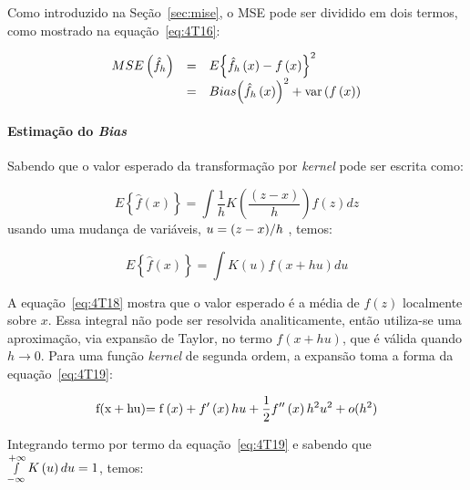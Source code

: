 Como introduzido na Seção~\ref{sec:mise}, o MSE pode ser dividido em dois termos, como mostrado na equação~\ref{eq:4T16}:

\begin{equation}\label{eq:4T16}
\begin{array}{ccl}
 MSE\left( {{{\hat f}_h}} \right) &=& E{\left\{ {{{\hat f}_h}\left( x \right) - f\left( x \right)} \right\}^2} \\
  &=& Bias{\left( {{{\hat f}_h}\left( x \right)} \right)^2} + {\mathop{\rm var}} \left( {f\left( x \right)} \right) \\
 \end{array}
\end{equation}

\paragraph{Estimação do \emph{Bias}}

Sabendo que o valor esperado da transformação por \emph{kernel} pode ser escrita como:

\begin{equation}\label{eq:4T17}
E\left\{ {\hat f\left( x \right)} \right\} = \int {\frac{1}{h}K\left( {\frac{{(z - x)}}{h}} \right)} f\left( z \right)dz
\end{equation}
usando uma mudança de variáveis, $u = {{\left( {z - x} \right)} \mathord{\left/
 {\vphantom {{\left( {z - x} \right)} h}} \right.
 \kern-\nulldelimiterspace} h}$ , temos:

\begin{equation}\label{eq:4T18}
E\left\{ {\hat f\left( x \right)} \right\} = \int {K\left( u \right)} f(x + hu)du
\end{equation}

A equação~\ref{eq:4T18} mostra que o valor esperado é a média de $f(z)$ localmente sobre $x$. Essa integral não pode ser resolvida analiticamente, então utiliza-se uma aproximação, via expansão de Taylor, no termo $f(x + hu)$, que é válida quando $h \to 0$. Para uma função \emph{kernel} de segunda ordem, a expansão toma a forma da equação~\ref{eq:4T19}:

\begin{equation}\label{eq:4T19}
{\rm{f}}({\rm{x + hu}}){\rm{ = f}}\left( x \right) + f'\left( x \right)hu + \frac{1}{2}f''\left( x \right){h^2}{u^2} + o({h^2})
\end{equation}

Integrando termo por termo da equação~\ref{eq:4T19} e sabendo que $\mathop \smallint \limits_{ - \infty }^{ + \infty } K\left( u \right)du = 1$, temos:


